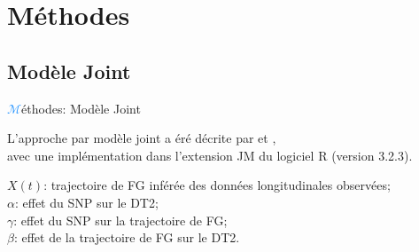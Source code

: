 \section{Méthodes}
\subsection{Modèle Joint}
\begin{frame}{{\huge\textcolor{dodgerblue}{$\mathcal{M}$}}éthodes: Modèle Joint}
\par{L'approche par modèle joint a éré décrite par \textcolor{dodgerblue}{\cite{tsiatis2004}} et \textcolor{dodgerblue}{\cite{ibrahim_basic_2010}},\\
avec une implémentation  dans l'extension \textcolor{springgreen3}{JM} \textcolor{dodgerblue}{\citep{rizopoulos_jm_2010}} du logiciel \textcolor{springgreen3}{R} (version 3.2.3)\textcolor{dodgerblue}{\citep{r_core_team_r_2015}}.}

\begin{minipage}[t]{0.475\columnwidth}
    \vspace{0.2cm}
    \begin{center}
    \end{center}
\end{minipage}%
\hfill\vline\hfill
\begin{minipage}[t]{0.475\columnwidth}%
    \par{\footnotesize \textcolor{springgreen3}{$X(t)$}: trajectoire de \textcolor{springgreen3}{FG} inférée des données longitudinales observées;\\
    \textcolor{springgreen3}{$\alpha$}: effet du SNP sur le \textcolor{springgreen3}{DT2};\\
    \textcolor{springgreen3}{$\gamma$}: effet du SNP sur la trajectoire de \textcolor{springgreen3}{FG};\\
    \textcolor{springgreen3}{$\beta$}: effet de la trajectoire de \textcolor{springgreen3}{FG} sur le \textcolor{springgreen3}{DT2}.}
\end{minipage}
\end{frame}

